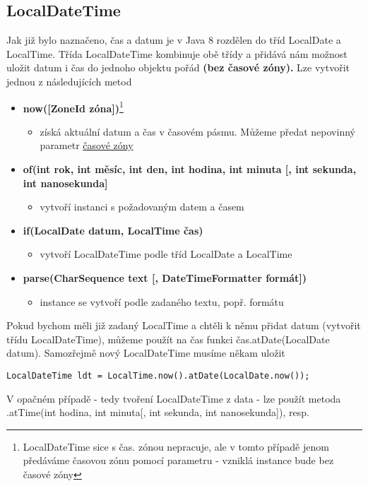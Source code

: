 \documentclass[11pt,a4paper,titlepage]{article}
\begin{document}
\subsection{LocalDateTime}
Jak již bylo naznačeno, čas a datum je v Java 8 rozdělen do tříd LocalDate a LocalTime. Třída LocalDateTime kombinuje obě třídy a přidává nám možnost uložit datum i čas do jednoho objektu pořád \textbf{(bez časové zóny).} Lze vytvořit jednou z následujících metod
\begin{itemize}
    \item \textbf{now([ZoneId zóna])}\footnote{LocalDateTime sice s čas. zónou nepracuje, ale v tomto případě jenom předáváme časovou zónu pomocí parametru - vzniklá instance bude bez časové zóny}
    \begin{itemize}
        \item získá aktuální datum a čas v časovém pásmu. Můžeme předat nepovinný parametr \href{https://en.wikipedia.org/wiki/List_of_tz_database_time_zones}{časové zóny} 
    \end{itemize}
    \item \textbf{of(int rok, int měsíc, int den, int hodina, int minuta [, int sekunda, int nanosekunda]}
    \begin{itemize}
        \item vytvoří instanci s požadovaným datem a časem
    \end{itemize}
    \item \textbf{if(LocalDate datum, LocalTime čas)}
    \begin{itemize}
        \item vytvoří LocalDateTime podle tříd LocalDate a LocalTime
    \end{itemize}
    \item \textbf{parse(CharSequence text [, DateTimeFormatter formát])}
    \begin{itemize}
        \item instance se vytvoří podle zadaného textu, popř. formátu
    \end{itemize}
\end{itemize}
Pokud bychom měli již zadaný LocalTime a chtěli k němu přidat datum (vytvořit třídu LocalDateTime), můžeme použít na čas funkci čas.atDate(LocalDate datum). Samozřejmě nový LocalDateTime musíme někam uložit
\begin{verbatim}
LocalDateTime ldt = LocalTime.now().atDate(LocalDate.now());
\end{verbatim}
V opačném případě - tedy tvoření LocalDateTime z data - lze použít metoda .atTime(int hodina, int minuta[, int sekunda, int nanosekunda]), resp.
\end{document}
